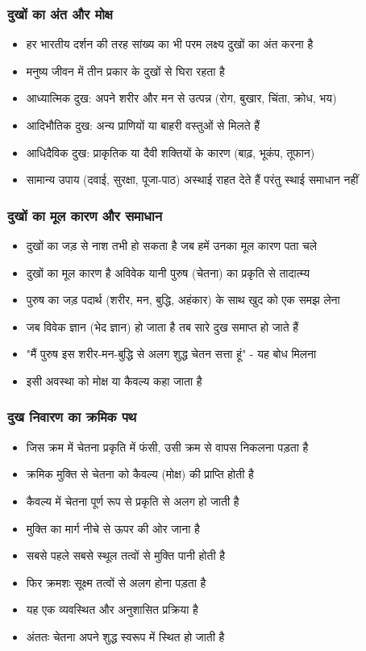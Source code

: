 \begin{frame}[fragile]\frametitle{दुखों का अंत और मोक्ष}
      \begin{itemize}
	\item हर भारतीय दर्शन की तरह सांख्य का भी परम लक्ष्य दुखों का अंत करना है
	\item मनुष्य जीवन में तीन प्रकार के दुखों से घिरा रहता है
	\item आध्यात्मिक दुख: अपने शरीर और मन से उत्पन्न (रोग, बुखार, चिंता, क्रोध, भय)
	\item आदिभौतिक दुख: अन्य प्राणियों या बाहरी वस्तुओं से मिलते हैं
	\item आधिदैविक दुख: प्राकृतिक या दैवी शक्तियों के कारण (बाढ़, भूकंप, तूफान)
	\item सामान्य उपाय (दवाई, सुरक्षा, पूजा-पाठ) अस्थाई राहत देते हैं परंतु स्थाई समाधान नहीं
	  \end{itemize}
\end{frame}

\begin{frame}[fragile]\frametitle{दुखों का मूल कारण और समाधान}
      \begin{itemize}
	\item दुखों का जड़ से नाश तभी हो सकता है जब हमें उनका मूल कारण पता चले
	\item दुखों का मूल कारण है अविवेक यानी पुरुष (चेतना) का प्रकृति से तादात्म्य
	\item पुरुष का जड़ पदार्थ (शरीर, मन, बुद्धि, अहंकार) के साथ खुद को एक समझ लेना
	\item जब विवेक ज्ञान (भेद ज्ञान) हो जाता है तब सारे दुख समाप्त हो जाते हैं
	\item "मैं पुरुष इस शरीर-मन-बुद्धि से अलग शुद्ध चेतन सत्ता हूं" - यह बोध मिलना
	\item इसी अवस्था को मोक्ष या कैवल्य कहा जाता है
	  \end{itemize}
\end{frame}

\begin{frame}[fragile]\frametitle{दुख निवारण का क्रमिक पथ}
      \begin{itemize}
          \item जिस क्रम में चेतना प्रकृति में फंसी, उसी क्रम से वापस निकलना पड़ता है
          \item क्रमिक मुक्ति से चेतना को कैवल्य (मोक्ष) की प्राप्ति होती है
          \item कैवल्य में चेतना पूर्ण रूप से प्रकृति से अलग हो जाती है
          \item मुक्ति का मार्ग नीचे से ऊपर की ओर जाना है
          \item सबसे पहले सबसे स्थूल तत्वों से मुक्ति पानी होती है
          \item फिर क्रमशः सूक्ष्म तत्वों से अलग होना पड़ता है
          \item यह एक व्यवस्थित और अनुशासित प्रक्रिया है
          \item अंततः चेतना अपने शुद्ध स्वरूप में स्थित हो जाती है
      \end{itemize}
\end{frame}

